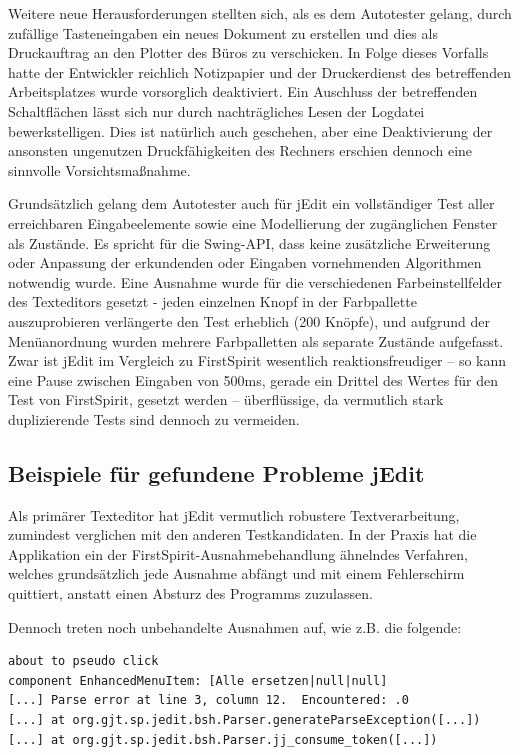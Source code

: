 Weitere neue Herausforderungen stellten sich, als es dem
Autotester gelang, durch zufällige Tasteneingaben ein neues 
Dokument zu erstellen und dies als Druckauftrag 
an den Plotter des Büros zu verschicken. In Folge dieses Vorfalls
hatte der Entwickler reichlich Notizpapier und der Druckerdienst
des betreffenden Arbeitsplatzes wurde vorsorglich deaktiviert.
Ein Auschluss der betreffenden Schaltflächen lässt sich
nur durch nachträgliches Lesen der Logdatei bewerkstelligen.
Dies ist natürlich auch geschehen, aber eine Deaktivierung
der ansonsten ungenutzen Druckfähigkeiten des Rechners
erschien dennoch eine sinnvolle Vorsichtsmaßnahme.

Grundsätzlich gelang dem Autotester auch für jEdit ein
vollständiger Test aller erreichbaren Eingabeelemente
sowie eine Modellierung der zugänglichen Fenster als
Zustände. Es spricht für die Swing-API, dass keine
zusätzliche Erweiterung oder Anpassung der erkundenden
oder Eingaben vornehmenden Algorithmen notwendig wurde.
Eine Ausnahme wurde für die verschiedenen Farbeinstellfelder
des Texteditors gesetzt - jeden einzelnen Knopf in der Farbpallette
auszuprobieren verlängerte den Test erheblich (200 Knöpfe),
und aufgrund der Menüanordnung wurden mehrere Farbpalletten
als separate Zustände aufgefasst. Zwar ist jEdit im Vergleich
zu FirstSpirit wesentlich reaktionsfreudiger -- so kann eine
Pause zwischen Eingaben von 500ms, gerade ein Drittel
des Wertes für den Test von FirstSpirit, gesetzt werden --
überflüssige, da vermutlich stark duplizierende Tests
sind dennoch zu vermeiden.


\subsection{Beispiele für gefundene Probleme jEdit}

Als primärer Texteditor hat jEdit vermutlich robustere Textverarbeitung,
zumindest verglichen mit den anderen Testkandidaten. In der Praxis
hat die Applikation ein der FirstSpirit-Ausnahmebehandlung ähnelndes
Verfahren, welches grundsätzlich jede Ausnahme abfängt und mit einem
Fehlerschirm quittiert, anstatt einen Absturz des Programms zuzulassen.

Dennoch treten noch unbehandelte Ausnahmen auf, wie z.B. die
folgende:

\begin{lstlisting}[float=!ht,label=fmjson,caption={Ausnahme bei Texteingabe}]
about to pseudo click 
component EnhancedMenuItem: [Alle ersetzen|null|null]
[...] Parse error at line 3, column 12.  Encountered: .0
[...] at org.gjt.sp.jedit.bsh.Parser.generateParseException([...])
[...] at org.gjt.sp.jedit.bsh.Parser.jj_consume_token([...])
\end{lstlisting}

